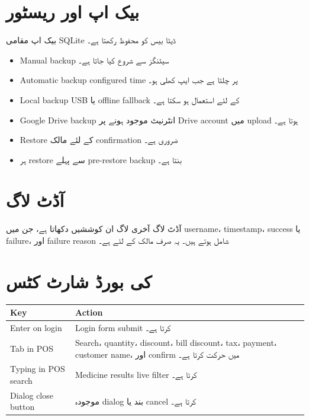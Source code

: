 \documentclass[12pt,a4paper]{article}
\begin{document}
\section{بیک اپ اور ریسٹور}
بیک اپ مقامی SQLite ڈیٹا بیس کو محفوظ رکھتا ہے۔
\begin{itemize}
  \item Manual backup سیٹنگز سے شروع کیا جاتا ہے۔
  \item Automatic backup configured time پر چلتا ہے جب ایپ کھلی ہو۔
  \item Local backup USB یا offline fallback کے لئے استعمال ہو سکتا ہے۔
  \item Google Drive backup انٹرنیٹ موجود ہونے پر Drive account میں upload ہوتا ہے۔
  \item Restore کے لئے مالک confirmation ضروری ہے۔
  \item ہر restore سے پہلے pre-restore backup بنتا ہے۔
\end{itemize}

\section{آڈٹ لاگ}
آڈٹ لاگ آخری لاگ ان کوششیں دکھاتا ہے، جن میں username، timestamp، success یا failure، اور failure reason شامل ہوتے ہیں۔ یہ صرف مالک کے لئے ہے۔

\section{کی بورڈ شارٹ کٹس}
\begin{longtable}{>{\raggedright\arraybackslash}p{4cm}>{\raggedright\arraybackslash}p{9cm}}
\toprule
\textbf{Key} & \textbf{Action} \\
\midrule
Enter on login & Login form submit کرتا ہے۔ \\
Tab in POS & Search، quantity، discount، bill discount، tax، payment، customer name، اور confirm میں حرکت کرتا ہے۔ \\
Typing in POS search & Medicine results live filter کرتا ہے۔ \\
Dialog close button & موجودہ dialog بند یا cancel کرتا ہے۔ \\
\bottomrule
\end{longtable}
\end{document}
